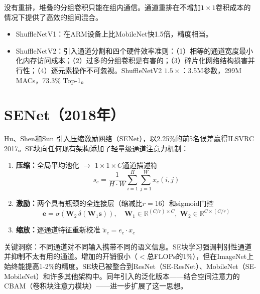 没有重排，堆叠的分组卷积只能在组内通信。通道重排在不增加$1\times1$卷积成本的情况下提供了高效的组间混合。

\begin{properties}[ShuffleNet变体]
\begin{itemize}
    \item ShuffleNetV1：在ARM设备上比MobileNet快1.5倍，精度相当。
    \item ShuffleNetV2：引入通道分割和四个硬件效率准则：（1）相等的通道宽度最小化内存访问成本；（2）过多的分组卷积是有害的；（3）碎片化网络结构损害并行性；（4）逐元素操作不可忽视。ShuffleNetV2 $1.5\times$：3.5M参数，299M MACs，73.3\% Top-1。
\end{itemize}
\end{properties}

\section{SENet（2018年）}

Hu、Shen和Sun \cite{hu2018squeeze}引入压缩激励网络（SENet），以2.25\%的前5名误差赢得ILSVRC 2017。SE块向任何现有架构添加了轻量级通道注意力机制：

\begin{architecture}[SE块]
\begin{enumerate}
    \item \textbf{压缩：}全局平均池化 $\rightarrow$ $1\times 1\times C$通道描述符
    \begin{equation}
    s_c = \frac{1}{H \cdot W}\sum_{i=1}^{H}\sum_{j=1}^{W} x_c(i,j)
    \end{equation}
    \item \textbf{激励：}两个具有瓶颈的全连接层（缩减比$r=16$）和sigmoid门控
    \begin{equation}
    \mathbf{e} = \sigma\!\left(\mathbf{W}_2 \,\delta\!\left(\mathbf{W}_1 \mathbf{s}\right)\right), \quad \mathbf{W}_1 \in \mathbb{R}^{(C/r)\times C},\; \mathbf{W}_2 \in \mathbb{R}^{C\times (C/r)}
    \end{equation}
    \item \textbf{缩放：}逐通道特征重新校准 $\tilde{x}_c = e_c \cdot x_c$
\end{enumerate}
\end{architecture}

关键洞察：不同通道对不同输入携带不同的语义信息。SE块学习强调判别性通道并抑制不太有用的通道。增加的开销很小（$<$总FLOPs的1\%），但在ImageNet上始终能提高1-2\%的精度。SE块已被整合到ResNet（SE-ResNet）、MobileNet（SE-MobileNet）和许多其他架构中。同年引入的泛化版本——结合空间注意力的CBAM（卷积块注意力模块）\cite{woo2018cbam}——进一步扩展了这一思想。

